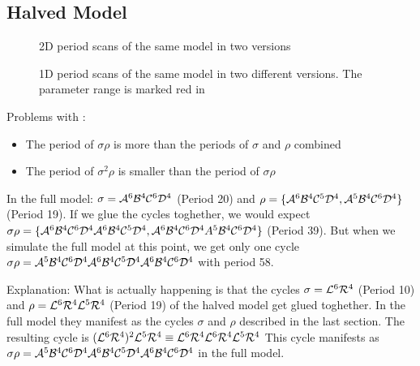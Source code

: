 \subsection{Halved Model}


\begin{figure}
    \centering
    \caption{2D period scans of the same model in two versions}
    \label{fig:minrep.adding1.corner.period}
\end{figure}

\begin{figure}
    \centering
    \caption{1D period scans of the same model in two different versions. The parameter range is marked red in }
\end{figure}

Problems with :
\begin{itemize}
    \item The period of $\sigma\rho$ is more than the periods of $\sigma$ and $\rho$ combined
    \item The period of $\sigma^2\rho$ is smaller than the period of $\sigma\rho$
\end{itemize}

In the full model: $\sigma = \mathcal{A}^6\mathcal{B}^4\mathcal{C}^6\mathcal{D}^4$ (Period 20) and $\rho = \{\mathcal{A}^6\mathcal{B}^4\mathcal{C}^5\mathcal{D}^4, \mathcal{A}^5\mathcal{B}^4\mathcal{C}^6\mathcal{D}^4\}$ (Period 19).
If we glue the cycles toghether, we would expect $\sigma\rho = \{\mathcal{A}^6\mathcal{B}^4\mathcal{C}^6\mathcal{D}^4\mathcal{A}^6\mathcal{B}^4\mathcal{C}^5\mathcal{D}^4, \mathcal{A}^6\mathcal{B}^4\mathcal{C}^6\mathcal{D}^4A^5\mathcal{B}^4\mathcal{C}^6\mathcal{D}^4\}$ (Period 39).
But when we simulate the full model at this point, we get only one cycle $\sigma\rho = \mathcal{A}^5\mathcal{B}^4\mathcal{C}^6\mathcal{D}^4\mathcal{A}^6\mathcal{B}^4\mathcal{C}^5\mathcal{D}^4\mathcal{A}^6\mathcal{B}^4\mathcal{C}^6\mathcal{D}^4$ with period 58.

Explanation: What is actually happening is that the cycles $\sigma = \mathcal{L}^6\mathcal{R}^4$ (Period 10) and $\rho = \mathcal{L}^6\mathcal{R}^4\mathcal{L}^5\mathcal{R}^4$ (Period 19) of the halved model get glued toghether.
In the full model they manifest as the cycles $\sigma$ and $\rho$ described in the last section.
The resulting cycle is $(\mathcal{L}^6\mathcal{R}^4)^2\mathcal{L}^5\mathcal{R}^4 \equiv \mathcal{L}^6\mathcal{R}^4\mathcal{L}^6\mathcal{R}^4\mathcal{L}^5\mathcal{R}^4$
This cycle manifests as $\sigma\rho = \mathcal{A}^5\mathcal{B}^4\mathcal{C}^6\mathcal{D}^4\mathcal{A}^6\mathcal{B}^4\mathcal{C}^5\mathcal{D}^4\mathcal{A}^6\mathcal{B}^4\mathcal{C}^6\mathcal{D}^4$ in the full model.

